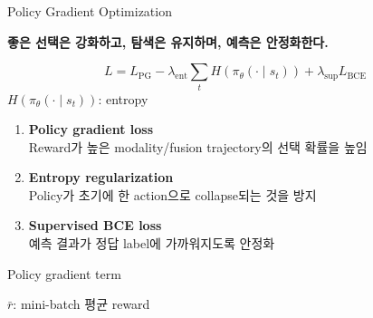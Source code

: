 \documentclass[11pt,notheorems,hyperref={pdfauthor=whatever}]{beamer}
\begin{document}
\begin{frame}[t]{Policy Gradient Optimization}
\small
\vspace{0.05em}
\begin{center}
\large\bfseries
좋은 선택은 강화하고, 탐색은 유지하며, 예측은 안정화한다.
\end{center}
\vspace{-0.2em}
\begin{center}
{\Large
\[
L=L_{\mathrm{PG}}-\lambda_{\mathrm{ent}}\sum_t H(\pi_\theta(\cdot\mid s_t))+\lambda_{\mathrm{sup}}L_{\mathrm{BCE}}
\]
}
\vspace{-0.8em}
{\scriptsize\textcolor{AccentOrange}{%
\(H(\pi_\theta(\cdot\mid s_t))\): entropy
}}
\end{center}
\vspace{-0.45em}
\begin{enumerate}
  \item \textbf{Policy gradient loss}\\[-0.1em]
  \footnotesize Reward가 높은 modality/fusion trajectory의 선택 확률을 높임

  \vspace{0.45em}
  \item \textbf{Entropy regularization}\\[-0.1em]
  \footnotesize Policy가 초기에 한 action으로 collapse되는 것을 방지

  \vspace{0.45em}
  \item \textbf{Supervised BCE loss}\\[-0.1em]
  \footnotesize 예측 결과가 정답 label에 가까워지도록 안정화
\end{enumerate}
\vspace{0.35em}
\begin{block}{Policy gradient term}
\centering
\vspace{-0.2em}
\vspace{-0.6em}
\begin{flushright}
\scriptsize \(\bar r\): mini-batch 평균 reward\hspace{1.2em}
\end{flushright}
\end{block}
\end{frame}
\end{document}

